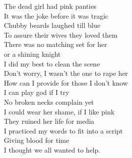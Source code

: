 The dead girl had pink panties\\
It was the joke before it was tragic\\
Chubby beards laughed till blue\\
To assure their wives they loved them\\

There was no matching set for her\\
or a shining knight\\
I did my best to clean the scene\\
Don't worry, I wasn't the one to rape her\\

How can I provide for those I don't know\\
I can play god if I try\\
No broken necks complain yet\\
I could wear her shame, if I like pink\\

They ruined her life for media\\
I practiced my words to fit into a script\\
Giving blood for time\\
I thought we all wanted to help.\\

